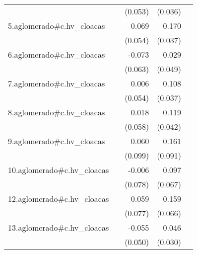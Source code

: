 {\begin{longtable}{l*{4}{D{.}{.}{-1}}}
            &                     &     (0.053)         &     (0.036)         &                     \\
\addlinespace
5.aglomerado#c.hv\_cloacas&                     &       0.069         &       0.170\sym{***}&                     \\
            &                     &     (0.054)         &     (0.037)         &                     \\
\addlinespace
6.aglomerado#c.hv\_cloacas&                     &      -0.073         &       0.029         &                     \\
            &                     &     (0.063)         &     (0.049)         &                     \\
\addlinespace
7.aglomerado#c.hv\_cloacas&                     &       0.006         &       0.108\sym{**} &                     \\
            &                     &     (0.054)         &     (0.037)         &                     \\
\addlinespace
8.aglomerado#c.hv\_cloacas&                     &       0.018         &       0.119\sym{**} &                     \\
            &                     &     (0.058)         &     (0.042)         &                     \\
\addlinespace
9.aglomerado#c.hv\_cloacas&                     &       0.060         &       0.161         &                     \\
            &                     &     (0.099)         &     (0.091)         &                     \\
\addlinespace
10.aglomerado#c.hv\_cloacas&                     &      -0.006         &       0.097         &                     \\
            &                     &     (0.078)         &     (0.067)         &                     \\
\addlinespace
12.aglomerado#c.hv\_cloacas&                     &       0.059         &       0.159\sym{*}  &                     \\
            &                     &     (0.077)         &     (0.066)         &                     \\
\addlinespace
13.aglomerado#c.hv\_cloacas&                     &      -0.055         &       0.046         &                     \\
            &                     &     (0.050)         &     (0.030)         &                     \\

\end{longtable}}
